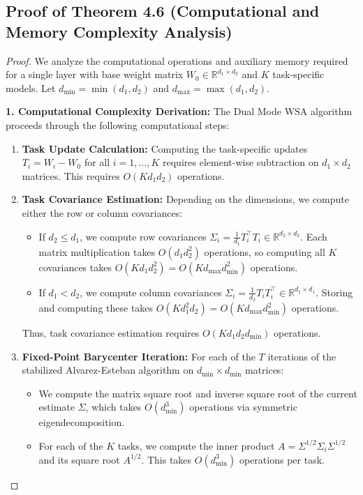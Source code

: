 \documentclass{article}
\theoremstyle{plain}
\theoremstyle{definition}
\theoremstyle{remark}
\begin{document}
\subsection{Proof of Theorem 4.6 (Computational and Memory Complexity Analysis)}
\label{appendix:proof-complexity}
\begin{proof}
We analyze the computational operations and auxiliary memory required for a single layer with base weight matrix $W_0 \in \mathbb{R}^{d_1 \times d_2}$ and $K$ task-specific models.
Let $d_{\min} = \min(d_1, d_2)$ and $d_{\max} = \max(d_1, d_2)$.

\textbf{1. Computational Complexity Derivation:}
The Dual Mode WSA algorithm proceeds through the following computational steps:
\begin{enumerate}
  \item \textbf{Task Update Calculation:} Computing the task-specific updates $T_i = W_i - W_0$ for all $i = 1, \dots, K$ requires element-wise subtraction on $d_1 \times d_2$ matrices. This requires $O(K d_1 d_2)$ operations.
  \item \textbf{Task Covariance Estimation:} Depending on the dimensions, we compute either the row or column covariances:
  \begin{itemize}
    \item If $d_2 \leq d_1$, we compute row covariances $\Sigma_i = \frac{1}{d_1} T_i^\top T_i \in \mathbb{R}^{d_2 \times d_2}$. Each matrix multiplication takes $O(d_1 d_2^2)$ operations, so computing all $K$ covariances takes $O(K d_1 d_2^2) = O(K d_{\max} d_{\min}^2)$ operations.
    \item If $d_1 < d_2$, we compute column covariances $\Sigma_i = \frac{1}{d_2} T_i T_i^\top \in \mathbb{R}^{d_1 \times d_1}$. Storing and computing these takes $O(K d_1^2 d_2) = O(K d_{\max} d_{\min}^2)$ operations.
  \end{itemize}
  Thus, task covariance estimation requires $O(K d_1 d_2 d_{\min})$ operations.
  \item \textbf{Fixed-Point Barycenter Iteration:} For each of the $T$ iterations of the stabilized Alvarez-Esteban algorithm on $d_{\min} \times d_{\min}$ matrices:
  \begin{itemize}
    \item We compute the matrix square root and inverse square root of the current estimate $\Sigma$, which takes $O(d_{\min}^3)$ operations via symmetric eigendecomposition.
    \item For each of the $K$ tasks, we compute the inner product $A = \Sigma^{1/2} \Sigma_i \Sigma^{1/2}$ and its square root $A^{1/2}$. This takes $O(d_{\min}^3)$ operations per task.

\end{itemize}
\end{enumerate}
\end{proof}
\end{document}
